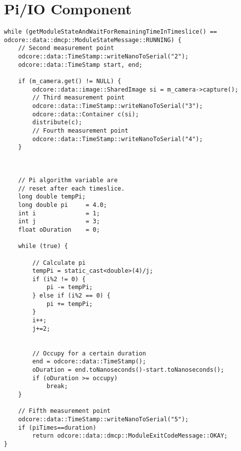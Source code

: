 \section{Pi/IO Component}
\begin{lstlisting}[frame={single},label={code:pi-io}]
while (getModuleStateAndWaitForRemainingTimeInTimeslice() == odcore::data::dmcp::ModuleStateMessage::RUNNING) {
	// Second measurement point
    odcore::data::TimeStamp::writeNanoToSerial("2");
    odcore::data::TimeStamp start, end;

    if (m_camera.get() != NULL) {
        odcore::data::image::SharedImage si = m_camera->capture();
        // Third measurement point
        odcore::data::TimeStamp::writeNanoToSerial("3");
        odcore::data::Container c(si);
        distribute(c);
        // Fourth measurement point
        odcore::data::TimeStamp::writeNanoToSerial("4");
    }



    // Pi algorithm variable are
    // reset after each timeslice.
    long double tempPi;
    long double pi     = 4.0;
    int i              = 1;
    int j              = 3;
    float oDuration    = 0;

    while (true) {

        // Calculate pi
        tempPi = static_cast<double>(4)/j;
        if (i%2 != 0) {
            pi -= tempPi;
        } else if (i%2 == 0) {
            pi += tempPi;
        }
        i++;
        j+=2;


        // Occupy for a certain duration
        end = odcore::data::TimeStamp();
        oDuration = end.toNanoseconds()-start.toNanoseconds();
        if (oDuration >= occupy)
            break;
    }

    // Fifth measurement point
    odcore::data::TimeStamp::writeNanoToSerial("5");
    if (piTimes==duration)
        return odcore::data::dmcp::ModuleExitCodeMessage::OKAY;
}
\end{lstlisting}


